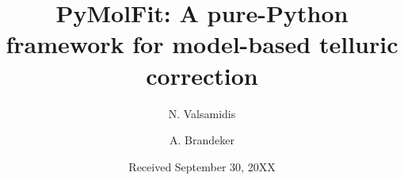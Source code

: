 \documentclass{aa}
\begin{document}
   \title{PyMolFit: A pure-Python framework for model-based telluric correction}

   \subtitle{}

%
%
%

   \author{N. Valsamidis        %
        \and A. Brandeker
        }


   \date{Received September 30, 20XX}

 
\end{document}
